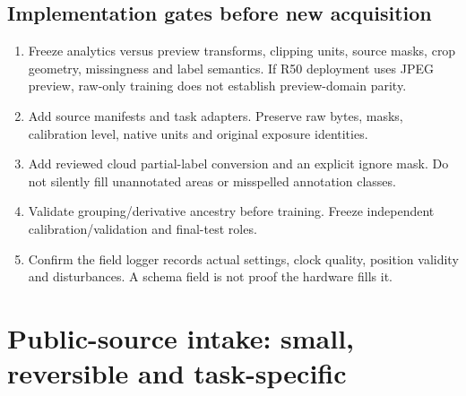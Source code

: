 \documentclass[11pt,a4paper]{article}
\begin{document}
\subsection{Implementation gates before new acquisition}
\begin{enumerate}
\item Freeze analytics versus preview transforms, clipping units, source masks,
crop geometry, missingness and label semantics. If R50 deployment uses JPEG
preview, raw-only training does not establish preview-domain parity.
\item Add source manifests and task adapters. Preserve raw bytes, masks,
calibration level, native units and original exposure identities.
\item Add reviewed cloud partial-label conversion and an explicit ignore mask.
Do not silently fill unannotated areas or misspelled annotation classes.
\item Validate grouping/derivative ancestry before training. Freeze independent
calibration/validation and final-test roles.
\item Confirm the field logger records actual settings, clock quality, position
validity and disturbances. A schema field is not proof the hardware fills it.
\end{enumerate}

\clearpage
\section{Public-source intake: small, reversible and task-specific}
\end{document}
